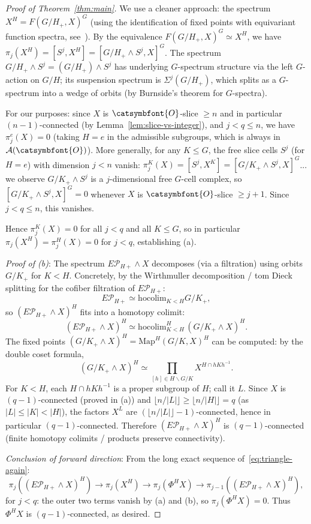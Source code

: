 \documentclass[12pt]{article}
\newcommand{\aO}{{\catsymbfont{O}}}
\theoremstyle{definition}
\begin{document}
\begin{proof}[Proof of Theorem~\ref{thm:main}]
We use a cleaner approach: the spectrum $X^H = F(G/H_+, X)^G$ (using the identification of fixed points with equivariant function spectra, see~\cite[II.3.2]{LMS}).  By the equivalence $F(G/H_+, X)^G \simeq X^H$, we have $\pi_j(X^H) = [S^j, X^H] = [G/H_+\wedge S^j, X]^G$.  The spectrum $G/H_+\wedge S^j = (G/H_+) \wedge S^j$ has underlying $G$-spectrum structure via the left $G$-action on $G/H$; its suspension spectrum is $\Sigma^j(G/H_+)$, which splits as a $G$-spectrum into a wedge of orbits (by Burnside's theorem for $G$-spectra).

For our purposes: since $X$ is $\aO$-slice $\geq n$ and in particular $(n-1)$-connected (by Lemma~\ref{lem:slice-vs-integer}), and $j < q \leq n$, we have $\pi_j^e(X) = 0$ (taking $H=e$ in the admissible subgroups, which is always in $\mathcal{A}(\aO)$).  More generally, for any $K\leq G$, the free slice cells $S^j$ (for $H=e$) with dimension $j < n$ vanish: $\pi_j^K(X) = [S^j, X^K] = [G/K_+\wedge S^j, X]^G$... we observe $G/K_+\wedge S^j$ is a $j$-dimensional free $G$-cell complex, so $[G/K_+\wedge S^j, X]^G = 0$ whenever $X$ is $\aO$-slice $\geq j+1$.  Since $j < q \leq n$, this vanishes.

Hence $\pi_j^K(X) = 0$ for all $j < q$ and all $K\leq G$, so in particular $\pi_j(X^H) = \pi_j^H(X) = 0$ for $j < q$, establishing (a).

\noindent\emph{Proof of (b)}: The spectrum $E\mathcal{P}_{H+}\wedge X$ decomposes (via a filtration) using orbits $G/K_+$ for $K < H$.  Concretely, by the Wirthmuller decomposition / tom Dieck splitting for the cofiber filtration of $E\mathcal{P}_{H+}$:
\[
   E\mathcal{P}_{H+} \simeq \mathrm{hocolim}_{K < H} G/K_+,
\]
so $(E\mathcal{P}_{H+}\wedge X)^H$ fits into a homotopy colimit:
\[
   (E\mathcal{P}_{H+}\wedge X)^H \simeq \mathrm{hocolim}_{K < H}^H\, (G/K_+\wedge X)^H.
\]
The fixed points $(G/K_+\wedge X)^H = \mathrm{Map}^H(G/K, X)^H$ can be computed: by the double coset formula,
\[
   (G/K_+\wedge X)^H \simeq \prod_{[h]\in H\backslash G/K} X^{H\cap hKh^{-1}}.
\]
For $K < H$, each $H\cap hKh^{-1}$ is a proper subgroup of $H$; call it $L$.  Since $X$ is $(q-1)$-connected (proved in (a)) and $\lfloor n/|L|\rfloor \geq \lfloor n/|H|\rfloor = q$ (as $|L| \leq |K| < |H|$), the factors $X^L$ are $(\lfloor n/|L|\rfloor - 1)$-connected, hence in particular $(q-1)$-connected.  Therefore $(E\mathcal{P}_{H+}\wedge X)^H$ is $(q-1)$-connected (finite homotopy colimits / products preserve connectivity).

\noindent\emph{Conclusion of forward direction}: From the long exact sequence of~\eqref{eq:triangle-again}:
\[
   \pi_j((E\mathcal{P}_{H+}\wedge X)^H) \to \pi_j(X^H) \to \pi_j(\Phi^H X) \to \pi_{j-1}((E\mathcal{P}_{H+}\wedge X)^H),
\]
for $j < q$: the outer two terms vanish by (a) and (b), so $\pi_j(\Phi^H X) = 0$.  Thus $\Phi^H X$ is $(q-1)$-connected, as desired.


\end{proof}
\end{document}
